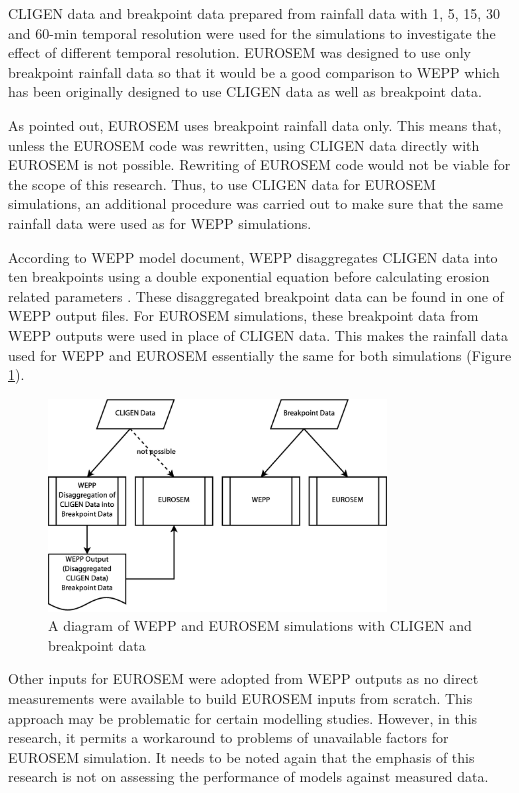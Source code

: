 CLIGEN data and breakpoint data prepared from rainfall data with 1, 5, 15,
30 and 60-min temporal resolution were used for the simulations to investigate
the
effect of different temporal resolution.
EUROSEM was designed to use only breakpoint rainfall data so that it would
be a good comparison to WEPP which has been originally designed to use CLIGEN
data as well as breakpoint data.

As pointed out, EUROSEM uses breakpoint rainfall data only. This means that,
unless the EUROSEM code was rewritten, using CLIGEN data directly with EUROSEM
is not possible. Rewriting of EUROSEM code would not be viable for the scope of
this research. Thus, to use CLIGEN data for EUROSEM simulations, an additional
procedure was carried out to make sure that the same rainfall data were used as
for WEPP simulations.

According to WEPP model document, WEPP disaggregates CLIGEN data into ten
breakpoints using a double exponential equation before calculating erosion
related parameters \citep[see][\S 2.2]{flanagan1995-usda}. These disaggregated
breakpoint data can be found in one of WEPP output files. For EUROSEM
simulations, these breakpoint data from WEPP outputs were used in place of
CLIGEN data. This makes the rainfall data used for WEPP and EUROSEM essentially
the same for both simulations (Figure \ref{fig:eurosem_cligen_workaround}).

\begin{figure}[htbp]
  \centering
    \includegraphics[width=0.8\textwidth]{./img/eurosem_cligen_workaround}
  \caption{A diagram of WEPP and EUROSEM simulations with CLIGEN and breakpoint
data}
  \label{fig:eurosem_cligen_workaround}
\end{figure}

Other inputs for EUROSEM were adopted from WEPP outputs as no direct
measurements were available to build EUROSEM inputs from scratch. This approach
may be problematic for certain modelling studies. However, in this research, it
permits a workaround to problems of unavailable factors for EUROSEM simulation.
It needs to be noted again that the emphasis of this research is not on
assessing the performance of models against measured data.

